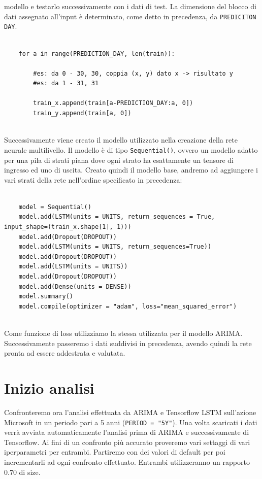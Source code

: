 \documentclass[a4paper,12pt]{article}
\begin{document}
        modello e testarlo successivamente con i dati di test. La 
        dimensione del blocco di dati assegnato all'input è determinato, 
        come detto in precedenza, da \lstinline|PREDICITON DAY|.
\begin{lstlisting}[frame = single]

    for a in range(PREDICTION_DAY, len(train)):

        #es: da 0 - 30, 30, coppia (x, y) dato x -> risultato y
        #es: da 1 - 31, 31

        train_x.append(train[a-PREDICTION_DAY:a, 0])
        train_y.append(train[a, 0])
    
\end{lstlisting}
        Successivamente viene creato il modello utilizzato nella creazione
        della rete neurale multilivello. Il modello è di tipo 
        \lstinline|Sequential()|, ovvero un modello adatto per una pila di 
        strati piana dove ogni strato ha esattamente un tensore di ingresso
        ed uno di uscita.
        Creato quindi il modello base, andremo ad aggiungere i vari strati
        della rete nell'ordine specificato in precedenza:
\begin{lstlisting}[frame = single]

    model = Sequential()
    model.add(LSTM(units = UNITS, return_sequences = True, input_shape=(train_x.shape[1], 1)))
    model.add(Dropout(DROPOUT))
    model.add(LSTM(units = UNITS, return_sequences=True))
    model.add(Dropout(DROPOUT))
    model.add(LSTM(units = UNITS))
    model.add(Dropout(DROPOUT))
    model.add(Dense(units = DENSE))
    model.summary()
    model.compile(optimizer = "adam", loss="mean_squared_error")
    
\end{lstlisting}
        Come funzione di loss utilizziamo la stessa utilizzata per il 
        modello ARIMA. Successivamente passeremo i dati suddivisi in
        precedenza, avendo quindi la rete pronta ad essere addestrata e 
        valutata.

    \section{Inizio analisi} Confronteremo ora l'analisi effettuata da ARIMA e 
    Tensorflow LSTM sull'azione Microsoft in un periodo pari a 5 anni
    (\lstinline|PERIOD = "5Y"|). Una volta scaricati i dati verrà avviata 
    automaticamente l'analisi prima di ARIMA e successivamente di Tensorflow.
    Ai fini di un confronto più accurato proveremo vari settaggi di vari 
    iperparametri per entrambi. Partiremo con dei valori di default per poi 
    incrementarli ad ogni confronto effettuato. Entrambi utilizzeranno un 
    rapporto 0.70 di size.
\end{document}
